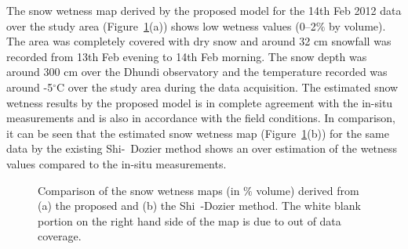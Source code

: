 The snow wetness map derived by the proposed model for the 14th Feb 2012 data over the study area (Figure~\ref{fig:proposed_shi_dozier_results}(a)) shows low wetness values (0--2$\%$ by volume). The area was completely covered with dry snow and around 32 cm snowfall was recorded from 13th Feb evening to 14th Feb morning. The snow depth was around 300 cm over the Dhundi observatory and the temperature recorded was around -5$^\circ$C over the study area during the data acquisition. The estimated snow wetness results by the proposed model is in complete agreement with the in-situ measurements and is also in accordance with the field conditions. In comparison, it can be seen that the estimated snow wetness map (Figure~\ref{fig:proposed_shi_dozier_results}(b)) for the same data by the existing Shi-~Dozier method shows an over estimation of the wetness values compared to the in-situ measurements. 
\begin{figure}[!thpb]
	\centering
	\caption[Comparison of the proposed and Shi~-Dozier snow wetness maps of 14 Feb. 2012 Radarsat-2 data] {Comparison of the snow wetness maps (in $\%$ volume) derived from (a) the proposed and (b) the Shi~-Dozier method. The white blank portion on the right hand side of the map is due to out of data coverage.}
	\label{fig:proposed_shi_dozier_results}
\end{figure}

